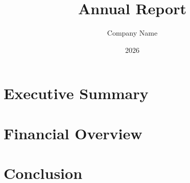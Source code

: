 \documentclass[11pt]{report}
\begin{document}
\title{Annual Report}
\author{Company Name}
\date{2026}
\maketitle

\chapter{Executive Summary}
\lipsum[1]

\chapter{Financial Overview}
\lipsum[2-3]

\chapter{Conclusion}
\lipsum[4]
\end{document}
